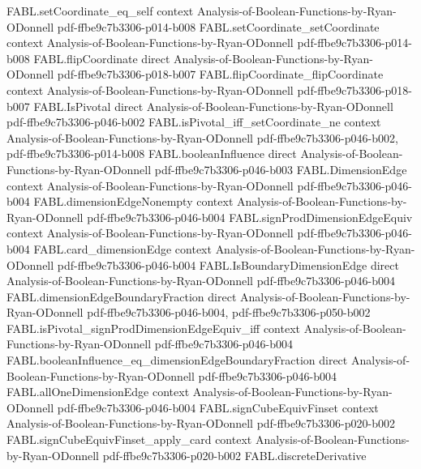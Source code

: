 \begin{theorem}
\proofstep
  {FABL.setCoordinate_eq_self}
  {context}
  {Analysis-of-Boolean-Functions-by-Ryan-ODonnell}
  {pdf-ffbe9c7b3306-p014-b008}
\proofstep
  {FABL.setCoordinate_setCoordinate}
  {context}
  {Analysis-of-Boolean-Functions-by-Ryan-ODonnell}
  {pdf-ffbe9c7b3306-p014-b008}
\proofstep
  {FABL.flipCoordinate}
  {direct}
  {Analysis-of-Boolean-Functions-by-Ryan-ODonnell}
  {pdf-ffbe9c7b3306-p018-b007}
\proofstep
  {FABL.flipCoordinate_flipCoordinate}
  {context}
  {Analysis-of-Boolean-Functions-by-Ryan-ODonnell}
  {pdf-ffbe9c7b3306-p018-b007}
\proofstep
  {FABL.IsPivotal}
  {direct}
  {Analysis-of-Boolean-Functions-by-Ryan-ODonnell}
  {pdf-ffbe9c7b3306-p046-b002}
\proofstep
  {FABL.isPivotal_iff_setCoordinate_ne}
  {context}
  {Analysis-of-Boolean-Functions-by-Ryan-ODonnell}
  {pdf-ffbe9c7b3306-p046-b002,
    pdf-ffbe9c7b3306-p014-b008}
\proofstep
  {FABL.booleanInfluence}
  {direct}
  {Analysis-of-Boolean-Functions-by-Ryan-ODonnell}
  {pdf-ffbe9c7b3306-p046-b003}
\proofstep
  {FABL.DimensionEdge}
  {context}
  {Analysis-of-Boolean-Functions-by-Ryan-ODonnell}
  {pdf-ffbe9c7b3306-p046-b004}
\proofstep
  {FABL.dimensionEdgeNonempty}
  {context}
  {Analysis-of-Boolean-Functions-by-Ryan-ODonnell}
  {pdf-ffbe9c7b3306-p046-b004}
\proofstep
  {FABL.signProdDimensionEdgeEquiv}
  {context}
  {Analysis-of-Boolean-Functions-by-Ryan-ODonnell}
  {pdf-ffbe9c7b3306-p046-b004}
\proofstep
  {FABL.card_dimensionEdge}
  {context}
  {Analysis-of-Boolean-Functions-by-Ryan-ODonnell}
  {pdf-ffbe9c7b3306-p046-b004}
\proofstep
  {FABL.IsBoundaryDimensionEdge}
  {direct}
  {Analysis-of-Boolean-Functions-by-Ryan-ODonnell}
  {pdf-ffbe9c7b3306-p046-b004}
\proofstep
  {FABL.dimensionEdgeBoundaryFraction}
  {direct}
  {Analysis-of-Boolean-Functions-by-Ryan-ODonnell}
  {pdf-ffbe9c7b3306-p046-b004,
    pdf-ffbe9c7b3306-p050-b002}
\proofstep
  {FABL.isPivotal_signProdDimensionEdgeEquiv_iff}
  {context}
  {Analysis-of-Boolean-Functions-by-Ryan-ODonnell}
  {pdf-ffbe9c7b3306-p046-b004}
\proofstep
  {FABL.booleanInfluence_eq_dimensionEdgeBoundaryFraction}
  {direct}
  {Analysis-of-Boolean-Functions-by-Ryan-ODonnell}
  {pdf-ffbe9c7b3306-p046-b004}
\proofstep
  {FABL.allOneDimensionEdge}
  {context}
  {Analysis-of-Boolean-Functions-by-Ryan-ODonnell}
  {pdf-ffbe9c7b3306-p046-b004}
\proofstep
  {FABL.signCubeEquivFinset}
  {context}
  {Analysis-of-Boolean-Functions-by-Ryan-ODonnell}
  {pdf-ffbe9c7b3306-p020-b002}
\proofstep
  {FABL.signCubeEquivFinset_apply_card}
  {context}
  {Analysis-of-Boolean-Functions-by-Ryan-ODonnell}
  {pdf-ffbe9c7b3306-p020-b002}
\proofstep
  {FABL.discreteDerivative}

\end{theorem}
